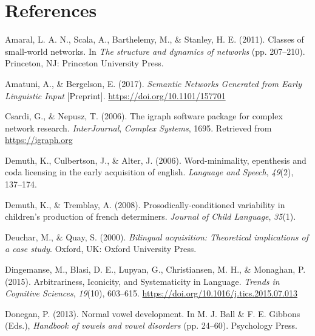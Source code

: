 \documentclass[
  man]{apa6}
\newlength{\cslhangindent}
\newenvironment{CSLReferences}[2] %
 {\begin{list}{}{%
  \setlength{\itemindent}{0pt}
  \setlength{\leftmargin}{0pt}
  \setlength{\parsep}{0pt}
  \ifodd #1
   \setlength{\leftmargin}{\cslhangindent}
   \setlength{\itemindent}{-1\cslhangindent}
  \fi
  \setlength{\itemsep}{#2\baselineskip}}}
 {\end{list}}
\begin{document}
\section*{References}\label{references}

\label{refs}
\begin{CSLReferences}{1}{0}
Amaral, L. A. N., Scala, A., Barthelemy, M., \& Stanley, H. E. (2011). Classes of small-world networks. In \emph{The structure and dynamics of networks} (pp. 207--210). Princeton, {NJ}: Princeton University Press.

Amatuni, A., \& Bergelson, E. (2017). \emph{Semantic {Networks} {Generated} from {Early} {Linguistic} {Input}} {[}Preprint{]}. \url{https://doi.org/10.1101/157701}

Csardi, G., \& Nepusz, T. (2006). The igraph software package for complex network research. \emph{InterJournal}, \emph{Complex Systems}, 1695. Retrieved from \url{https://igraph.org}

Demuth, K., Culbertson, J., \& Alter, J. (2006). Word-minimality, epenthesis and coda licensing in the early acquisition of english. \emph{Language and Speech}, \emph{49}(2), 137--174.

Demuth, K., \& Tremblay, A. (2008). Prosodically-conditioned variability in children's production of french determiners. \emph{Journal of Child Language}, \emph{35}(1).

Deuchar, M., \& Quay, S. (2000). \emph{Bilingual acquisition: Theoretical implications of a case study}. Oxford, {UK}: Oxford University Press.

Dingemanse, M., Blasi, D. E., Lupyan, G., Christiansen, M. H., \& Monaghan, P. (2015). Arbitrariness, {Iconicity}, and {Systematicity} in {Language}. \emph{Trends in Cognitive Sciences}, \emph{19}(10), 603--615. \url{https://doi.org/10.1016/j.tics.2015.07.013}

Donegan, P. (2013). Normal vowel development. In M. J. Ball \& F. E. Gibbons (Eds.), \emph{Handbook of vowels and vowel disorders} (pp. 24--60). Psychology Press.


\end{CSLReferences}
\end{document}
